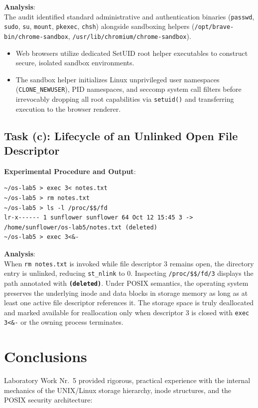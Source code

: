 \documentclass[12pt,a4paper]{article}
\begin{document}
\textbf{Analysis}: \\
The audit identified standard administrative and authentication binaries (\texttt{passwd}, \texttt{sudo}, \texttt{su}, \texttt{mount}, \texttt{pkexec}, \texttt{chsh}) alongside sandboxing helpers (\texttt{/opt/brave-bin/chrome-sandbox}, \texttt{/usr/lib/chromium/chrome-sandbox}).
\begin{itemize}
    \item Web browsers utilize dedicated SetUID root helper executables to construct secure, isolated sandbox environments.
    \item The sandbox helper initializes Linux unprivileged user namespaces (\texttt{CLONE\_NEWUSER}), PID namespaces, and seccomp system call filters before irrevocably dropping all root capabilities via \texttt{setuid()} and transferring execution to the browser renderer.
\end{itemize}

\subsection{Task (c): Lifecycle of an Unlinked Open File Descriptor}
\textbf{Experimental Procedure and Output}:
\begin{lstlisting}[style=consolestyle]
~/os-lab5 > exec 3< notes.txt
~/os-lab5 > rm notes.txt
~/os-lab5 > ls -l /proc/$$/fd
lr-x------ 1 sunflower sunflower 64 Oct 12 15:45 3 -> /home/sunflower/os-lab5/notes.txt (deleted)
~/os-lab5 > exec 3<&-
\end{lstlisting}

\textbf{Analysis}: \\
When \texttt{rm notes.txt} is invoked while file descriptor 3 remains open, the directory entry is unlinked, reducing \texttt{st\_nlink} to 0. Inspecting \texttt{/proc/\$\$/fd/3} displays the path annotated with \textbf{\texttt{(deleted)}}. Under POSIX semantics, the operating system preserves the underlying inode and data blocks in storage memory as long as at least one active file descriptor references it. The storage space is truly deallocated and marked available for reallocation only when descriptor 3 is closed with \texttt{exec 3<\&-} or the owning process terminates.

\newpage

\section{Conclusions}
Laboratory Work Nr.~5 provided rigorous, practical experience with the internal mechanics of the UNIX/Linux storage hierarchy, inode structures, and the POSIX security architecture:
\end{document}
